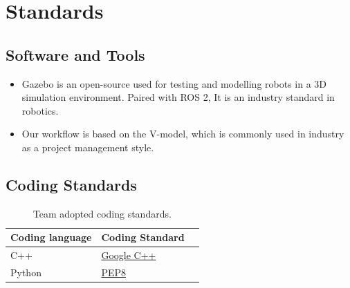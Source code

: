 \documentclass{article}
\begin{document}
\section{Standards}


\subsection{Software and Tools}
\begin{itemize}
	\item Gazebo is an open-source used for testing and modelling robots in a 3D simulation environment. Paired with ROS 2, It is an industry standard in robotics.
	\item Our workflow is based on the V-model, which is commonly used in industry as a project management style.
\end{itemize}

\subsection{Coding Standards}\label{sec:coding_standards}

\begin{table}[h!]
\centering
\begin{tabularx}{\textwidth}{|l|X|X|}
\hline
\textbf{Coding language} & \textbf{Coding Standard} \\ \hline
C++ & \href{https://google.github.io/styleguide/cppguide.html}{Google C++} \\
\hline
Python & \href{https://peps.python.org/pep-0008/}{PEP8} \\ \hline
\end{tabularx}
\caption{Team adopted coding standards.}
\end{table}

\newpage{}
\end{document}
